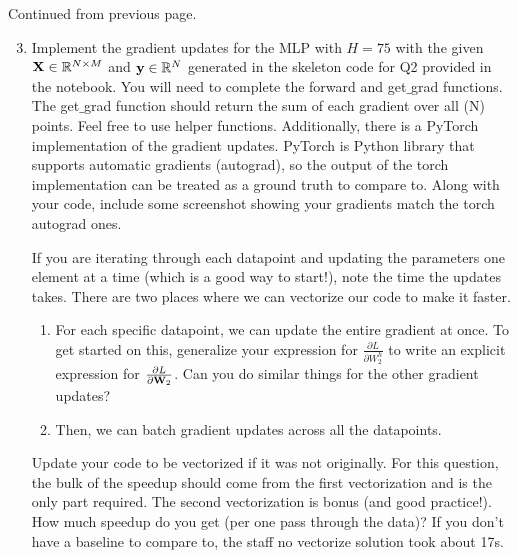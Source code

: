 \documentclass[submit]{harvardml}
\begin{document}
    \begin{problem}
     Continued from previous page.
     
    \begin{enumerate}
     \setcounter{enumi}{2}
    
    \item Implement the gradient updates for the MLP with $H = 75$ with the given $\bold{X} \in \mathbb{R}^{N \times M}$ and $\bold{y} \in \mathbb{R}^N$ generated in the skeleton code for Q2 provided in the notebook. You will need to complete the forward and get$\_$grad functions. The get$\_$grad function should return the sum of each gradient over all (N) points. Feel free to use helper functions. Additionally, there is a PyTorch implementation of the gradient updates. PyTorch is Python library that supports automatic gradients (autograd), so the output of the torch implementation can be treated as a ground truth to compare to. Along with your code, include some screenshot showing your gradients match the torch autograd ones.
    
    If you are iterating through each datapoint and updating the parameters one element at a time (which is a good way to start!), note the time the updates takes. There are two places where we can vectorize our code to make it faster.
    \begin{enumerate}
        \item For each specific datapoint, we can update the entire gradient at once.  To get started on this, generalize your expression for $\frac{\partial L}{\partial W_2^h}$ to write an explicit expression for $\frac{\partial L}{\partial \bold{W}_2}$. Can you do similar things for the other gradient updates? 
        
        \item Then, we can batch gradient updates across all the datapoints.
    \end{enumerate}
    
    Update your code to be vectorized if it was not originally. For this question, the bulk of the speedup should come from the first vectorization and is the only part required. The second vectorization is bonus (and good practice!). How much speedup do you get (per one pass through the data)? If you don't have a baseline to compare to, the staff no vectorize solution took about 17s.
  
\end{enumerate}

\end{problem}
\newpage
\end{document}
